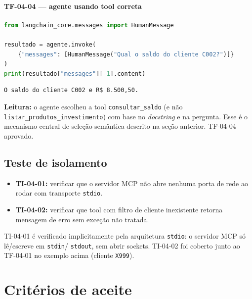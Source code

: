 \paragraph{TF-04-04 --- agente usando tool correta}

\begin{lstlisting}[language=Python,
      caption={TF-04-04 --- agente seleciona tool correta para pergunta de saldo.},
      label={lst:cap4_tf0404_codigo}]
from langchain_core.messages import HumanMessage

resultado = agente.invoke(
    {"messages": [HumanMessage("Qual o saldo do cliente C002?")]}
)
print(resultado["messages"][-1].content)
\end{lstlisting}

\begin{lstlisting}[language=bash,
      caption={TF-04-04 --- resposta do agente usando \texttt{consultar\_saldo}.},
      label={lst:cap4_tf0404_saida}]
O saldo do cliente C002 e R$ 8.500,50.
\end{lstlisting}

\noindent\textbf{Leitura:} o agente escolheu a tool
\texttt{consultar\_saldo} (e n\~ao \texttt{listar\_produtos\_investimento})
com base no \textit{docstring} e na pergunta. Esse \'e o mecanismo
central de sele\c{c}\~ao sem\^antica descrito na se\c{c}\~ao anterior.
TF-04-04 aprovado.

\subsection{Teste de isolamento}

\begin{itemize}[leftmargin=*]
  \item \textbf{TI-04-01:} verificar que o servidor MCP n\~ao abre
        nenhuma porta de rede ao rodar com transporte \texttt{stdio}.
  \item \textbf{TI-04-02:} verificar que tool com filtro
        de cliente inexistente retorna mensagem de erro sem
        exce\c{c}\~ao n\~ao tratada.
\end{itemize}

\noindent TI-04-01 \'e verificado implicitamente pela arquitetura
\texttt{stdio}: o servidor MCP s\'o l\^e/escreve em \texttt{stdin}/
\texttt{stdout}, sem abrir sockets. TI-04-02 foi coberto junto ao
TF-04-01 no exemplo acima (cliente \texttt{X999}).

\section{Crit\'erios de aceite}

